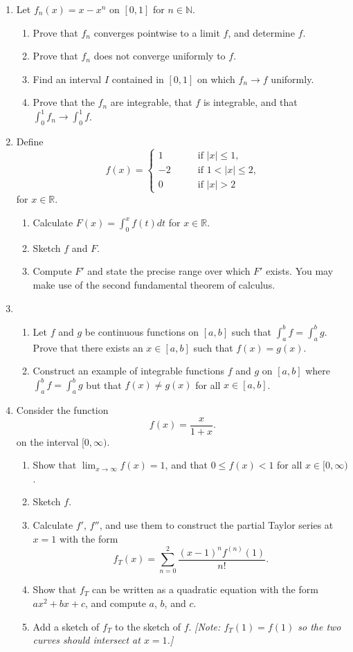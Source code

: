 \documentclass[12pt]{article}
\newcommand{\N}{\mathbb{N}}
\newcommand{\R}{\mathbb{R}}
\newcommand{\iab}{\int_a^b}
\begin{document}
\begin{enumerate}
  \item Let $f_n(x)=x-x^n$ on $[0,1]$ for $n\in \N$.
    \begin{enumerate}
      \item Prove that $f_n$ converges pointwise to a limit $f$, and determine $f$.
      \item Prove that $f_n$ does not converge uniformly to $f$.
      \item Find an interval $I$ contained in $[0,1]$ on
	which $f_n\to f$ uniformly.
      \item Prove that the $f_n$ are integrable, that $f$ is integrable,
	and that $\int_0^1 f_n \to \int_0^1 f$.
    \end{enumerate}
  \item Define
    \[
    f(x) = \left\{
    \begin{array}{ll}
      1 & \qquad \textrm{if $|x| \le 1$,} \\
      -2 & \qquad \textrm{if $1<|x| \le 2$,} \\
      0 & \qquad \textrm{if $|x|>2$}
    \end{array}
    \right.
    \]
    for $x\in \R$.
    \begin{enumerate}
      \item Calculate $F(x) = \int_0^x f(t) dt$ for $x\in \R$.
      \item Sketch $f$ and $F$.
      \item Compute $F'$ and state the precise range over which $F'$ exists.
	You may make use of the second fundamental theorem of calculus.
    \end{enumerate}
  \item
    \begin{enumerate}
      \item Let $f$ and $g$ be continuous functions on $[a,b]$ such that
	$\iab f=\iab g$. Prove that there exists an $x\in[a,b]$ such that
	$f(x)=g(x)$.
      \item Construct an example of integrable functions $f$ and $g$ on $[a,b]$
	where $\iab f = \iab g$ but that $f(x)\ne g(x)$ for all $x\in [a,b]$.
    \end{enumerate}
  \item Consider the function
    \[
    f(x) = \frac{x}{1+x}.
    \]
    on the interval $[0,\infty)$.
    \begin{enumerate}
      \item Show that $\lim_{x\to \infty} f(x) = 1$, and that $0\le f(x)<1$ for all
	$x \in [0,\infty)$.
      \item Sketch $f$.
      \item Calculate $f'$, $f''$, and use them to construct the partial Taylor series at $x=1$ with the form
	\[
	f_T(x)=\sum_{n=0}^2 \frac{(x-1)^nf^{(n)}(1)}{n!}.
	\]
      \item Show that $f_T$ can be written as a quadratic equation with the
	form $ax^2+bx+c$, and compute $a$, $b$, and $c$.
      \item Add a sketch of $f_T$ to the sketch of $f$. {\it[Note:
	$f_T(1)=f(1)$ so the two curves should intersect at $x=1$.]}
    \end{enumerate}


\end{enumerate}
\end{document}
